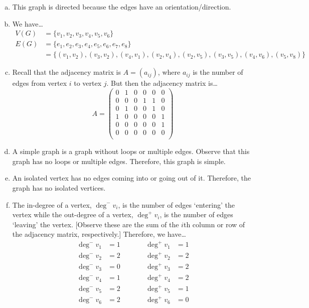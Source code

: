 \documentclass[11pt,letterpaper]{article}
\begin{document}
\sol
\begin{enumerate}[(a)]
\item This graph is directed because the edges have an orientation/direction. 

\item We have\dots
	\[
	\begin{aligned}
	V(G)&= \{ v_1, v_2, v_3, v_4, v_5, v_6 \} \\[0.3cm]
	E(G)&= \{ e_1, e_2, e_3, e_4, e_5, e_6, e_7, e_8 \} \\
	&= \{ (v_1, v_2), (v_3, v_2), (v_4, v_1), (v_2, v_4), (v_2, v_5), (v_3, v_5), (v_4, v_6), (v_5, v_8) \}
	\end{aligned}
	\]

\item Recall that the adjacency matrix is $A= (a_{ij})$, where $a_{ij}$ is the number of edges from vertex $i$ to vertex $j$. But then the adjacency matrix is\dots
	\[
	A=
	\begin{pmatrix}
	0 & 1 & 0 & 0 & 0 & 0 \\
	0 & 0 & 0 & 1 & 1 & 0 \\
	0 & 1 & 0 & 0 & 1 & 0 \\
	1 & 0 & 0 & 0 & 0 & 1 \\
	0 & 0 & 0 & 0 & 0 & 1 \\
	0 & 0 & 0 & 0 & 0 & 0 \\
	\end{pmatrix}
	\]

\item A simple graph is a graph without loops or multiple edges. Observe that this graph has no loops or multiple edges. Therefore, this graph is simple. 

\item An isolated vertex has no edges coming into or going out of it. Therefore, the graph has no isolated vertices. 
 
\item The in-degree of a vertex, $\deg^- v_i$, is the number of edges `entering' the vertex while the out-degree of a vertex, $\deg^+ v_i$, is the number of edges `leaving' the vertex. [Observe these are the sum of the $i$th column or row of the adjacency matrix, respectively.] Therefore, we have\dots
	\[
	\begin{aligned}
	\deg^- v_1&= 1 \qquad&& \deg^+ v_1&= 1 \\
	\deg^- v_2&= 2 && \deg^+ v_2&= 2 \\
	\deg^- v_3&= 0 && \deg^+ v_3&= 2 \\
	\deg^- v_4&= 1 && \deg^+ v_4&= 2 \\
	\deg^- v_5&= 2 && \deg^+ v_5&= 1 \\
	\deg^- v_6&= 2 && \deg^+ v_6&= 0 
	\end{aligned}
	\]


\end{enumerate}
\end{document}

